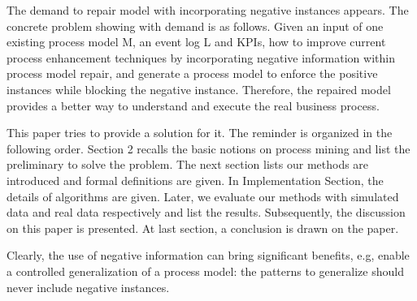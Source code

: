 The demand to repair model with incorporating negative instances appears. The concrete problem showing with demand is as follows. Given an input of one existing process model M, an event log L and KPIs, how  to improve current process enhancement techniques by incorporating negative information within process model repair, and generate a process model to enforce the positive instances while blocking the negative instance. Therefore, the repaired model provides a better way to understand and execute the real business process.


This paper tries to provide a solution for it. The reminder is organized in the following order. Section 2 recalls the basic notions on process mining and list the preliminary to solve the problem. The next section lists our methods are introduced and formal definitions are given. In Implementation Section, the details of algorithms are given. Later, we evaluate our methods with simulated data and real data respectively and list the results. Subsequently, the discussion on this paper is presented. At last section, a conclusion is drawn on the paper. 

Clearly, the use of negative information can bring significant benefits, e.g, enable a controlled generalization of a process model: the patterns to generalize should never include negative instances. 

%